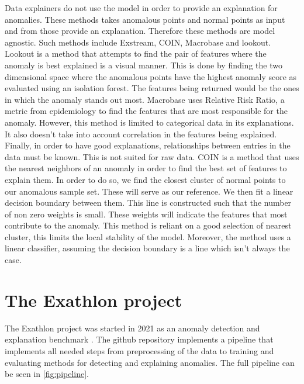 \documentclass[oneside, a4paper, onecolumn, 11pt]{article}
\begin{document}
Data explainers do not use the model in order to provide an explanation for anomalies. These methods takes anomalous points and normal points as input and from those provide an explanation. Therefore these methods are model agnostic. Such methods include Exstream, COIN, Macrobase and lookout. Lookout is a method that attempts to find the pair of features where the anomaly is best explained is a visual manner. This is done by finding the two dimensional space where the anomalous points have the highest anomaly score as evaluated using an isolation forest. The features being returned would be the ones in which the anomaly stands out most. Macrobase uses Relative Risk Ratio, a metric from epidemiology to find the features that are most responsible for the anomaly. However, this method is limited to categorical data in its explanations. It also doesn't take into account correlation in the features being explained. Finally, in order to have good explanations, relationships between entries in the data must be known. This is not suited for raw data. COIN is a method that uses the nearest neighbors of an anomaly in order to find the best set of features to explain them. In order to do so, we find the closest cluster of normal points to our anomalous sample set. These will serve as our reference. We then fit a linear decision boundary between them. This line is constructed such that the number of non zero weights is small. These weights will indicate the features that most contribute to the anomaly. This method is reliant on a good selection of nearest cluster, this limits the local stability of the model. Moreover, the method uses a linear classifier, assuming the decision boundary is a line which isn't always the case.\\
\section{The Exathlon project}
The Exathlon project was started in 2021 as an anomaly detection and explanation benchmark \cite{Exathlon}. The github repository implements a pipeline that implements all needed steps from preprocessing of the data to training and evaluating methods for detecting and explaining anomalies. The full pipeline can be seen in \autoref{fig:pipeline}.
\end{document}
